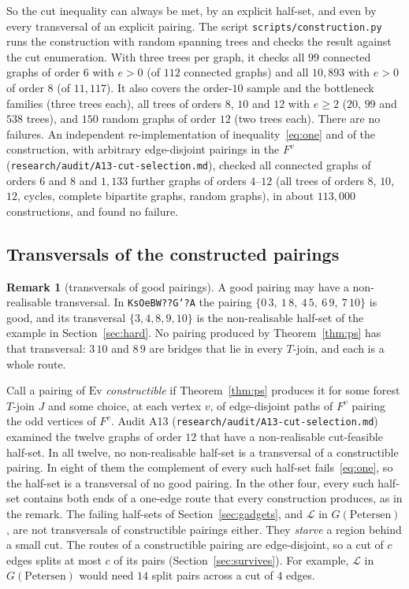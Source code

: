 \documentclass[11pt]{amsart}
\theoremstyle{definition}
\newtheorem*{remark*}{Remark}
\newcommand{\Ev}{\mathrm{Ev}}
\begin{document}
So the cut inequality can always be met, by an explicit half-set, and even by every transversal of
an explicit pairing. The script \texttt{scripts/construction.py} runs the construction with random
spanning trees and checks the result against the cut enumeration. With three trees per graph, it
checks all $99$ connected graphs of order $6$ with $e>0$ (of $112$ connected graphs) and all
$10{,}893$ with $e>0$ of order $8$ (of $11{,}117$). It also covers the order-$10$ sample and the
bottleneck families (three trees each), all trees of orders $8$, $10$ and $12$ with $e\ge2$ ($20$,
$99$ and $538$ trees), and $150$ random graphs of order $12$ (two trees each). There are no failures.
An independent re-implementation of inequality~\eqref{eq:one} and of the construction, with arbitrary
edge-disjoint pairings in the $F^v$ (\texttt{research/audit/A13-cut-selection.md}), checked all
connected graphs of orders $6$ and $8$ and $1{,}133$ further graphs of orders $4$--$12$ (all trees of
orders $8$, $10$, $12$, cycles, complete bipartite graphs, random graphs), in about $113{,}000$
constructions, and found no failure.

\subsection{Transversals of the constructed pairings}\label{sec:trc}

\begin{remark*}[transversals of good pairings]
A good pairing may have a non-realisable transversal. In \texttt{KsOeBW??G`?A} the pairing
$\{0\,3,\ 1\,8,\ 4\,5,\ 6\,9,\ 7\,10\}$ is good, and its transversal $\{3,4,8,9,10\}$ is the
non-realisable half-set of the example in Section~\ref{sec:hard}. No pairing produced by
Theorem~\ref{thm:ps} has that transversal: $3\,10$ and $8\,9$ are bridges that lie in every $T$-join,
and each is a whole route.
\end{remark*}

Call a pairing of $\Ev$ \emph{constructible} if Theorem~\ref{thm:ps} produces it for some forest
$T$-join $J$ and some choice, at each vertex $v$, of edge-disjoint paths of $F^v$ pairing the odd
vertices of $F^v$. Audit A13 (\texttt{research/audit/A13-cut-selection.md}) examined the twelve graphs
of order $12$ that have a non-realisable cut-feasible half-set. In all twelve, no non-realisable
half-set is a transversal of a constructible pairing. In eight of them the complement of every such
half-set fails~\eqref{eq:one}, so the half-set is a transversal of no good pairing. In the other four,
every such half-set contains both ends of a one-edge route that every construction produces, as in
the remark. The failing half-sets of Section~\ref{sec:gadgets}, and $\mathcal L$ in
$G(\text{Petersen})$, are not transversals of constructible pairings either. They \emph{starve} a region behind a small cut. The routes of a
constructible pairing are edge-disjoint, so a cut of $c$ edges splits at most $c$ of its pairs
(Section~\ref{sec:survives}). For example, $\mathcal L$ in $G(\text{Petersen})$ would need $14$ split
pairs across a cut of $4$ edges.
\end{document}
